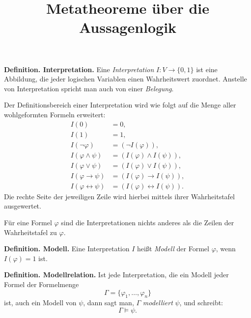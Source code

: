 \documentclass[9pt]{beamer}
\title{Metatheoreme über die Aussagenlogik}
\date{}
\newcommand{\strong}[1]{\textsf{\textbf{#1}}}
\begin{document}
\begin{frame}
\maketitle
\end{frame}

\begin{frame}
\strong{Definition. Interpretation.}
Eine \emph{Interpretation} $I\colon V\to\{0,1\}$ ist eine Abbildung,
die jeder logischen Variablen einen Wahrheitswert zuordnet.
Anstelle von Interpretation spricht man auch von einer \emph{Belegung}.
\end{frame}

\begin{frame}
Der Definitionsbereich einer Interpretation wird wie folgt
auf die Menge aller wohlgeformten Formeln erweitert:
\begin{align*}
I(0) &= 0,\\
I(1) &= 1,\\
I(\neg\varphi) &= (\neg I(\varphi)),\\
I(\varphi\land\psi) &= (I(\varphi)\land I(\psi)),\\
I(\varphi\lor\psi) &= (I(\varphi)\lor I(\psi)),\\
I(\varphi\rightarrow\psi) &= (I(\varphi)\rightarrow I(\psi)),\\
I(\varphi\leftrightarrow\psi) &= (I(\varphi)\leftrightarrow I(\psi)).
\end{align*}
Die rechte Seite der jeweiligen Zeile wird hierbei mittels ihrer
Wahrheitstafel ausgewertet.
\end{frame}

\begin{frame}
Für eine Formel $\varphi$ sind die Interpretationen
nichts anderes als die Zeilen der Wahrheitstafel zu $\varphi$.
\end{frame}

\begin{frame}
\strong{Definition. Modell.} Eine Interpretation $I$
heißt \emph{Modell} der Formel $\varphi$, wenn
$I(\varphi)=1$ ist.
\end{frame}

\begin{frame}
\strong{Definition. Modellrelation.}
Ist jede Interpretation, die ein Modell jeder Formel der Formelmenge
\[\Gamma=\{\varphi_1,\ldots,\varphi_n\}\]
ist, auch ein Modell von $\psi$, dann sagt man,
$\Gamma$ \emph{modelliert} $\psi$, und schreibt:
\[\Gamma\models\psi.\]
\end{frame}
\end{document}
